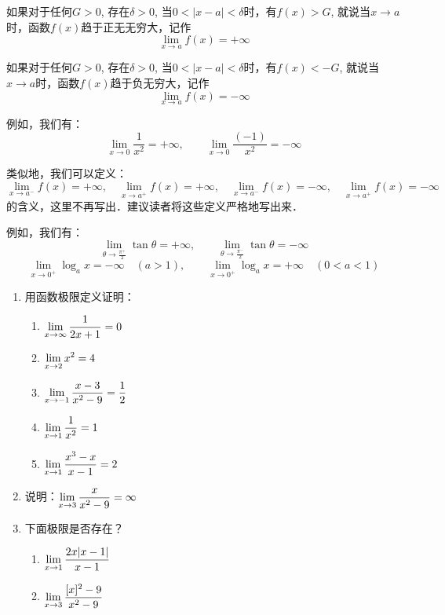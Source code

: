 如果对于任何$G>0$, 存在$\delta>0$, 当$0<|x-a|<\delta$时，有$f(x)>G$, 就说当$x\to a$时，函数$f(x)$趋于正无无穷大，记作
\[\lim_{x\to a}f(x)=+\infty\]

如果对于任何$G>0$, 存在$\delta>0$, 当$0<|x-a|<\delta$时，有$f(x)<-G$, 就说当$x\to a$时，函数$f(x)$趋于负无穷大，记作
\[\lim_{x\to a}f(x)=-\infty\]

例如，我们有：
\[\lim_{x\to 0}\frac{1}{x^2}=+\infty,\qquad \lim_{x\to 0}\frac{(-1)}{x^2}=-\infty\]

类似地，我们可以定义：
\[\lim_{x\to a^-}f(x)=+\infty,\quad \lim_{x\to a^+}f(x)=+\infty,\quad \lim_{x\to a^-}f(x)=-\infty,\quad \lim_{x\to a^+}f(x)=-\infty\]
的含义，这里不再写出．建议读者将这些定义严格地写出来．

例如，我们有：
\[\lim_{\theta\to \tfrac{\pi^+}{2}}\tan\theta =+\infty,\qquad \lim_{\theta\to \tfrac{\pi^-}{2}}\tan\theta =-\infty\]
\[\lim_{x\to 0^+}\log_a x =-\infty\quad (a>1),\qquad \lim_{x\to 0^+}\log_a x =+\infty\quad (0<a<1)\]

\begin{ex}
\begin{enumerate}
    \item 用函数极限定义证明：
    \begin{multicols}{2}
        \begin{enumerate}
            \item $\displaystyle\lim_{x\to \infty}\dfrac{1}{2x+1}=0$
            \item $\displaystyle\lim_{x\to 2}x^2=4$
            \item $\displaystyle\lim_{x\to -1}\dfrac{x-3}{x^2-9}=\dfrac{1}{2}$
            \item $\displaystyle\lim_{x\to 1}\dfrac{1}{x^2}=1$
            \item $\displaystyle\lim_{x\to 1}\dfrac{x^3-x}{x-1}=2$
        \end{enumerate}
    \end{multicols}
    \item 说明：$\displaystyle\lim_{x\to 3}\dfrac{x}{x^2-9}=\infty$
    \item 下面极限是否存在？
\begin{multicols}{2}
    \begin{enumerate}
        \item $\displaystyle\lim_{x\to 1}\dfrac{2x|x-1|}{x-1}$
        \item $\displaystyle\lim_{x\to 3}\dfrac{[x]^2-9}{x^2-9}$
    \end{enumerate}
\end{multicols}
\end{enumerate}
\end{ex}

